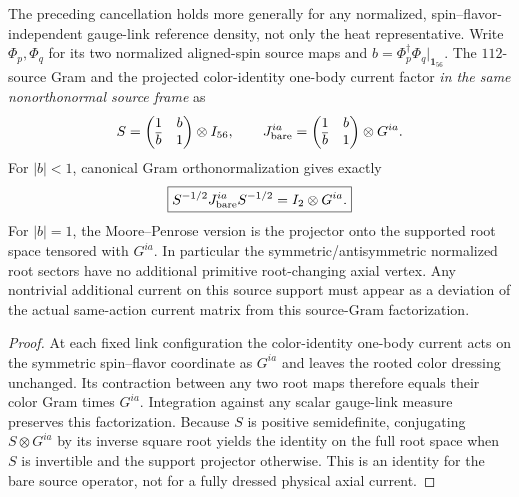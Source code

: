 \documentclass[12pt,a4paper]{article}
\begin{document}
\begin{proposition}
\label{p10:prop:v378-root-gram-current-cancellation}
The preceding cancellation holds more generally for any normalized,
spin--flavor-independent gauge-link reference density, not only the
heat representative.  Write $\Phi_p,\Phi_q$ for its two normalized
aligned-spin source maps and $b=\Phi_p^\dagger\Phi_q|_{\mathbf1_{56}}$.
The $112$-source Gram and the projected color-identity one-body
current factor \emph{in the same nonorthonormal source frame} as
\[
 S=\begin{pmatrix}1&b\\\overline b&1\end{pmatrix}\otimes I_{56},
 \qquad
 J_{\rm bare}^{ia}=\begin{pmatrix}1&b\\\overline b&1\end{pmatrix}
                      \otimes G^{ia}.
\]
For $|b|<1$, canonical Gram orthonormalization gives exactly
\[
 \boxed{S^{-1/2}J_{\rm bare}^{ia}S^{-1/2}
             =I_2\otimes G^{ia}.}
\]
For $|b|=1$, the Moore--Penrose version is the projector onto the
supported root space tensored with $G^{ia}$. In particular the
symmetric/antisymmetric normalized root sectors have no additional
primitive root-changing axial vertex. Any nontrivial additional
current on this source support must appear as a deviation of the
actual same-action current matrix from this source-Gram factorization.
\end{proposition}
\begin{proof}
At each fixed link configuration the color-identity one-body current
acts on the symmetric spin--flavor coordinate as $G^{ia}$ and leaves
the rooted color dressing unchanged. Its contraction between any two
root maps therefore equals their color Gram times $G^{ia}$. Integration
against any scalar gauge-link measure preserves this factorization.
Because $S$ is positive semidefinite, conjugating $S\otimes G^{ia}$
by its inverse square root yields the identity on the full root
space when $S$ is invertible and the support projector otherwise.
This is an identity for the bare source operator, not for a fully
dressed physical axial current.
\end{proof}
\end{document}
